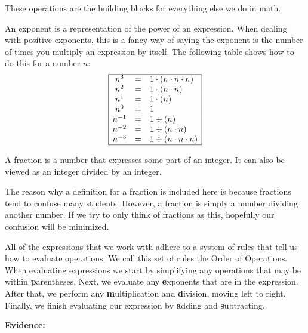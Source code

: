 
These operations are the building blocks for everything else we do in math.
\begin{defn}[Exponent]
An exponent is a representation of the power of an expression. When dealing with positive exponents, this is a fancy way of saying the exponent is the number of times you multiply an expression by itself. The following table shows how to do this for a number $n$:
$$
\begin{array}{|ccl|}
\hline 
n^3 & = & 1 \cdot (n \cdot n \cdot n) \\
n^2 & = & 1 \cdot (n \cdot n) \\
n^1 & = & 1 \cdot( n )\\
n^0 & = & 1 \\
n^{-1} & = & 1 \div (n) \\
n^{-2} & = & 1 \div (n \cdot n) \\
n^{-3} & = & 1 \div (n \cdot n \cdot n)\\
\hline
\end{array}
$$ 
\end{defn}






\begin{defn}[Fraction]
	A fraction is a number that expresses some part of an integer. It can also be viewed as an integer divided by an integer. 
\end{defn}

The reason why a definition for a fraction is included here is because fractions tend to confuse many students. However, a fraction is simply a number dividing another number. If we try to only think of fractions as this, hopefully our confusion will be minimized. 

\begin{theorem}
All of the expressions that we work with adhere to a system of rules that tell us how to evaluate operations. We call this set of rules the Order of Operations. When evaluating expressions we start by simplifying any operations that may be within \textbf{p}arentheses. Next, we evaluate any \textbf{e}xponents that are in the expression. After that, we perform any \textbf{m}ultiplication and \textbf{d}ivision, moving left to right. Finally, we finish evaluating our expression by \textbf{a}dding and \textbf{s}ubtracting. 
\end{theorem}

\noindent
\textbf{Evidence:}

